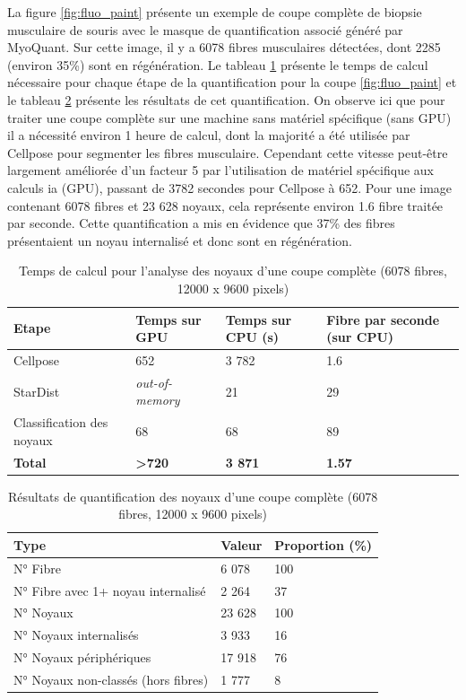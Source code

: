 La figure \ref{fig:fluo_paint} présente un exemple de coupe complète de biopsie musculaire de souris avec le masque de quantification associé généré par MyoQuant. Sur cette image, il y a 6078 fibres musculaires détectées, dont 2285 (environ 35\%) sont en régénération. Le tableau \ref{tab:myoquant_fluo_time} présente le temps de calcul nécessaire pour chaque étape de la quantification pour la coupe \ref{fig:fluo_paint} et le tableau \ref{tab:myoquant_fluo_results} présente les résultats de cet quantification. On observe ici que pour traiter  une coupe complète sur une machine sans matériel spécifique (sans GPU) il a nécessité environ 1 heure de calcul, dont la majorité a été utilisée par Cellpose pour segmenter les fibres musculaire. Cependant cette vitesse peut-être largement améliorée d'un facteur 5 par l'utilisation de matériel spécifique aux calculs \gls{ia} (GPU), passant de 3782 secondes pour Cellpose à 652. Pour une image contenant 6078 fibres et 23 628 noyaux, cela représente environ 1.6 fibre traitée par seconde. Cette quantification a mis en évidence que 37\% des fibres présentaient un noyau internalisé et donc sont en régénération.
\begin{table}[ht]
\centering
\caption{Temps de calcul pour l'analyse des noyaux d'une coupe complète (6078 fibres, 12000 x 9600 pixels)}
\label{tab:myoquant_fluo_time}
\begin{tabularx}{\textwidth}{|X|X|X|X|}
\hline
\textbf{Etape} & \textbf{Temps sur GPU} & \textbf{Temps sur CPU (s)} & \textbf{Fibre par seconde (sur CPU)} \\
\toprule
Cellpose & 652 & 3 782 & 1.6 \\
\hline
StarDist & \textit{out-of-memory} & 21 & 29 \\
\hline
Classification des noyaux & 68 & 68 & 89 \\
\hline
\textbf{Total} & \textbf{>720} & \textbf{3 871} & \textbf{1.57} \\
\hline
\end{tabularx}
\end{table}
\begin{table}[ht]
\centering
\caption{Résultats de quantification des noyaux d'une coupe complète (6078 fibres, 12000 x 9600 pixels)}
\label{tab:myoquant_fluo_results}
\begin{tabularx}{\textwidth}{|X|X|X|}
\hline
\textbf{Type} & \textbf{Valeur} & \textbf{Proportion (\%)} \\
\toprule
N° Fibre & 6 078 & 100 \\
\hline
N° Fibre avec 1+ noyau internalisé & 2 264 & 37 \\
\hline
\hline
N° Noyaux & 23 628 & 100 \\
\hline
N° Noyaux internalisés & 3 933 & 16 \\
\hline
N° Noyaux périphériques & 17 918 & 76 \\
\hline
N° Noyaux non-classés (hors fibres) & 1 777 & 8 \\
\hline
\end{tabularx}
\end{table}
